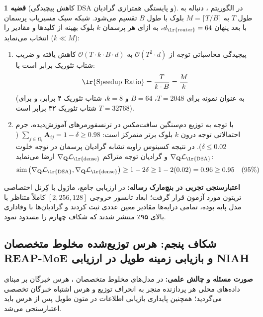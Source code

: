 \documentclass[12pt,a4paper]{report}
\theoremstyle{definition}
\newtheorem{theorem}{قضیه}[chapter]
\begin{document}
\begin{theorem}[کاهش پیچیدگی DSA و پایستگی همترازی گرادیان]
\label{thm:dsa_gradient_alignment}
در الگوریتم ، دنباله به طول $T$ به $M = \lceil T/B \rceil$ بلوک با طول $B$ تقسیم می‌شود. شبکه سبک مسیریاب پرسمان با بعد پنهان $d_{\text{\lr{router}}} = 64$، به ازای هر پرسمان $k$ بلوک بهینه از کلیدها و مقادیر را انتخاب می‌نماید ($k \ll M$):
\begin{enumerate}
    \item پیچیدگی محاسباتی توجه از $\mathcal{O}(T^2 \cdot d)$ به $\mathcal{O}(T \cdot k \cdot B \cdot d)$ کاهش یافته و ضریب شتاب تئوریک برابر است با:
    \begin{equation}
    \text{\lr{Speedup Ratio}} = \frac{T}{k \cdot B} = \frac{M}{k}
    \end{equation}
    (به عنوان نمونه برای $T=2048$، $B=64$ و $k=8$، شتاب تئوریک ۴ برابر، و برای $T=32768$ شتاب تئوریک ۳۲ برابر است).
    \item با توجه به توزیع دم‌سنگین سافت‌مکس در ترنسفورمرهای آموزش‌دیده، جرم احتمالاتی توجه درون $k$ بلوک برتر متمرکز است: $\sum_{j \in \Omega_i} \mathbf{A}_{ij} = 1 - \delta \ge 0.98$ ($\delta \le 0.02$). در نتیجه کسینوس زاویه تشابه گرادیان پرسمان در توجه خلوت $\nabla_{\mathbf{Q}}\mathcal{L}_{\text{\lr{DSA}}}$ و گرادیان توجه متراکم $\nabla_{\mathbf{Q}}\mathcal{L}_{\text{\lr{dense}}}$ ارضا می‌نماید:
    \begin{equation}
    \operatorname{sim}\left( \nabla_{\mathbf{Q}}\mathcal{L}_{\text{\lr{DSA}}}, \nabla_{\mathbf{Q}}\mathcal{L}_{\text{\lr{dense}}} \right) \ge 1 - 2\delta \ge 1 - 2(0.02) = 0.96 \ge 0.95 \quad (95\%)
    \end{equation}
\end{enumerate}
\end{theorem}

\textbf{اعتبارسنجی تجربی در بنچ‌مارک رساله:} در ارزیابی جامع، ماژول  با کِرنل اختصاصی تریتون  مورد آزمون قرار گرفت؛ ابعاد تانسور خروجی $[2, 256, 128]$ کاملاً متناظر با مدل پایه بوده، تمامی درایه‌ها مقادیر معین عددی  ثبت کردند و گرادیان‌ها با وفاداری بالای ۹۵٪ منتشر شدند که شکاف چهارم را مسدود نمود.

\subsection{شکاف پنجم: هرس توزیع‌شده مخلوط متخصصان REAP-MoE و بازیابی زمینه طویل در ارزیابی NIAH}
\label{subsec:gap5_reap_moe_niah}
\textbf{صورت مسئله و چالش علمی:} در مدل‌های مخلوط متخصصان ، هرس خبرگان بر مبنای داده‌های محلی هر پردازنده  منجر به انحراف توزیع و هرس اشتباه خبرگان تخصصی می‌گردید؛ همچنین پایداری بازیابی اطلاعات در متون طویل پس از هرس باید اعتبارسنجی می‌شد.
\end{document}
